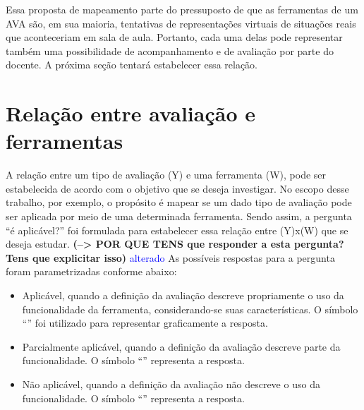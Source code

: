 Essa proposta de mapeamento parte do pressuposto de que as ferramentas de um AVA são, em sua maioria, tentativas de representações virtuais de situações reais que aconteceriam em sala de aula. Portanto, cada uma delas pode representar também uma possibilidade de acompanhamento e de avaliação por parte do docente. A próxima seção tentará estabelecer essa relação.  

\section{Relação entre avaliação e ferramentas}


A relação entre um tipo de avaliação (Y) e uma ferramenta (W), pode ser estabelecida de acordo com o objetivo que se deseja investigar. No escopo desse trabalho, por exemplo, o propósito é mapear se um dado tipo de avaliação pode ser aplicada por meio de uma determinada ferramenta. Sendo assim, a pergunta ``é aplicável?'' foi formulada para estabelecer essa relação entre (Y)x(W) que se deseja estudar. \textbf{(--> POR QUE TENS que responder a esta pergunta? Tens que explicitar isso)} \textcolor{blue} {alterado} As possíveis respostas para a pergunta foram parametrizadas conforme abaixo:

\begin{itemize}
    \item Aplicável, quando a definição da avaliação descreve propriamente o uso da funcionalidade da ferramenta, considerando-se suas características. O símbolo ``'' foi utilizado para representar graficamente a resposta.
    \item Parcialmente aplicável, quando a definição da avaliação descreve parte da funcionalidade. O símbolo ``'' representa a resposta. \item Não aplicável, quando a definição da avaliação não descreve o uso da funcionalidade. O símbolo ``'' representa a resposta. 
\end{itemize}

